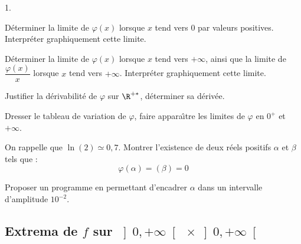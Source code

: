 \documentclass[11pt]{article}%
\begin{document}
\begin{noliste}{1.}
 \setlength{\itemsep}{4mm}
\item Déterminer la limite de $\varphi \left( x\right) $ lorsque $x$
tend vers $0$ par valeurs positives. Interpréter graphiquement cette
limite.

\item Déterminer la limite de $\varphi \left( x\right) $ lorsque $x$
tend vers $ + \infty $, ainsi que la limite de $\dfrac{\varphi \left(
x\right) 
}{x}$ lorsque $x$ tend vers $ + \infty $. Interpréter graphiquement
cette
limite.

\item Justifier la dérivabilité de $\varphi $ sur $\R^{+ \ast
}$, déterminer sa dérivée.

\item Dresser le tableau de variation de $\varphi $, faire
appara\^{\i}tre
les limites de $\varphi $ en $0^{+}$ et $ + \infty $.

\item On rappelle que $\ln \left( 2\right) \simeq 0,7$. Montrer
l'existence
de deux réels positifs $\alpha $ et $\beta $ tels que :
\[
\varphi \left( \alpha \right) = \left( \beta \right) = 0
\]

\item Proposer un programme en \Scilab{} permettant d'encadrer $\alpha
$ dans
un intervalle d'amplitude $10^{-2}$.
\end{noliste}

\subsection{Extrema de $f$ sur $\left] 0, + \infty \right[ \ \times
\left]
0, + \infty \right[ $}
\end{document}
